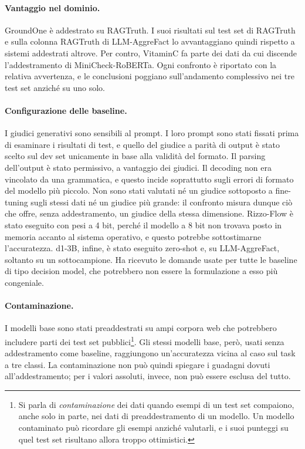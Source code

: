\paragraph{Vantaggio nel dominio.} GroundOne è addestrato su RAGTruth. I suoi risultati sul test set di RAGTruth e sulla
colonna RAGTruth di LLM-AggreFact lo avvantaggiano quindi rispetto a sistemi addestrati altrove. Per contro, VitaminC fa
parte dei dati da cui discende l'addestramento di MiniCheck-RoBERTa. Ogni confronto è riportato con la relativa
avvertenza, e le conclusioni poggiano sull'andamento complessivo nei tre test set anziché su uno solo.

\paragraph{Configurazione delle baseline.} I giudici generativi sono sensibili al prompt. I loro prompt sono stati
fissati prima di esaminare i risultati di test, e quello del giudice a parità di output è stato scelto sul dev set
unicamente in base alla validità del formato. Il parsing dell'output è stato permissivo, a vantaggio dei giudici. Il
decoding non era vincolato da una grammatica, e questo incide soprattutto sugli errori di formato del modello più
piccolo. Non sono stati valutati né un giudice sottoposto a fine-tuning sugli stessi dati né un giudice più grande: il
confronto misura dunque ciò che offre, senza addestramento, un giudice della stessa dimensione. Rizzo-Flow è stato
eseguito con pesi a 4 bit, perché il modello a 8 bit non trovava posto in memoria accanto al sistema operativo, e questo
potrebbe sottostimarne l'accuratezza. d1-3B, infine, è stato eseguito zero-shot e, su LLM-AggreFact, soltanto su un
sottocampione. Ha ricevuto le domande usate per tutte le baseline di tipo decision model, che potrebbero non essere la formulazione
a esso più congeniale.

\paragraph{Contaminazione.} I modelli base sono stati preaddestrati su ampi corpora web che potrebbero includere parti
dei test set pubblici\footnote{Si parla di \emph{contaminazione} dei dati quando esempi di un test set compaiono, anche
solo in parte, nei dati di preaddestramento di un modello. Un modello contaminato può ricordare gli esempi anziché
valutarli, e i suoi punteggi su quel test set risultano allora troppo ottimistici.}. Gli stessi modelli base, però,
usati senza addestramento come baseline, raggiungono un'accuratezza vicina al caso sul task a tre classi. La
contaminazione non può quindi spiegare i guadagni dovuti all'addestramento; per i valori assoluti, invece, non può essere
esclusa del tutto.

